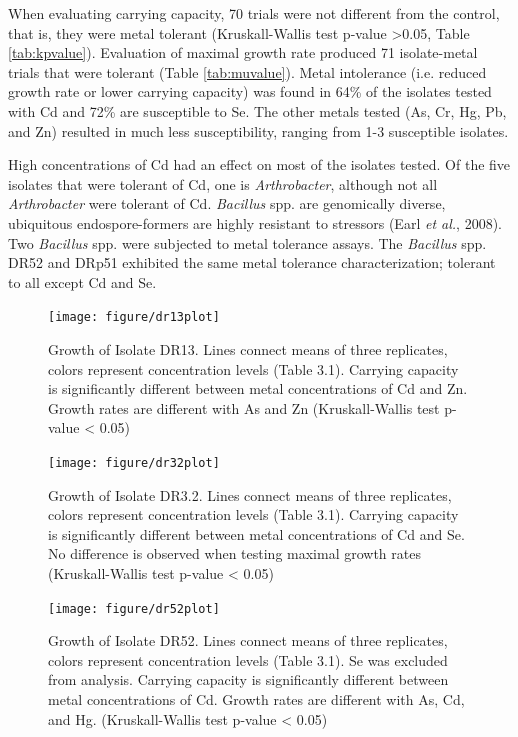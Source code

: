 \documentclass[ms, hidelinks]{uncgdissertationexp}
\theoremstyle{plain}
\theoremstyle{definition}
\theoremstyle{remark}
\begin{document}
When evaluating carrying capacity, 70 trials were not different from the control, that is, they were metal tolerant (Kruskall-Wallis test p-value \textgreater0.05, Table \ref{tab:kpvalue}). Evaluation of maximal growth rate produced 71 isolate-metal trials that were tolerant (Table \ref{tab:muvalue}). Metal intolerance (i.e. reduced growth rate or lower carrying capacity) was found in 64\% of the isolates tested with Cd and 72\% are susceptible to Se. The other metals tested (As, Cr, Hg, Pb, and Zn) resulted in much less susceptibility, ranging from 1-3 susceptible isolates.

High concentrations of Cd had an effect on most of the isolates tested. Of the five isolates that were tolerant of Cd, one is \emph{Arthrobacter}, although not all \emph{Arthrobacter} were tolerant of Cd. \emph{Bacillus} spp. are genomically diverse, ubiquitous endospore-formers are highly resistant to stressors (Earl \emph{et al.}, 2008). Two \emph{Bacillus} spp. were subjected to metal tolerance assays. The \emph{Bacillus} spp. DR52 and DRp51 exhibited the same metal tolerance characterization; tolerant to all except Cd and Se.
\begin{figure}[H]
    \centering
    \texttt{[image: figure/dr13plot]}
    \caption[Growth of Isolate DR13.]{Growth of Isolate DR13. Lines connect means of three replicates, colors represent concentration levels (Table 3.1). Carrying capacity is significantly different between metal concentrations of Cd and Zn.  Growth rates are different with As and Zn (Kruskall-Wallis test p-value < 0.05)}\label{fig:dr13}
\end{figure}
\begin{figure}
    \centering
    \texttt{[image: figure/dr32plot]}
    \caption[Growth of Isolate DR3.2.]{Growth of Isolate DR3.2. Lines connect means of three replicates, colors represent concentration levels (Table 3.1). Carrying capacity is significantly different between metal concentrations of Cd and Se. No difference is observed when testing maximal growth rates (Kruskall-Wallis test p-value < 0.05)}\label{fig:dr32}
\end{figure}
\begin{figure}
  
  \centering
    \texttt{[image: figure/dr52plot]}
    \caption[Growth of Isolate DR52.]{Growth of Isolate DR52. Lines connect means of three replicates, colors represent concentration levels (Table 3.1). Se was excluded from analysis. Carrying capacity is significantly different between metal concentrations of Cd. Growth rates are different with As, Cd, and Hg. (Kruskall-Wallis test p-value < 0.05) }\label{fig:dr52}
\end{figure}
\end{document}
